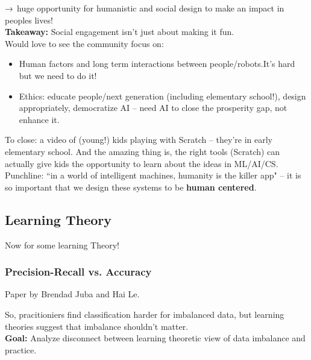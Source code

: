 $\rightarrow$ huge opportunity for humanistic and social design to make an impact in peoples lives! \\

{\bf Takeaway:} Social engagement isn't just about making it fun. \\

Would love to see the community focus on:
\begin{itemize}
    \item Human factors and long term interactions between people/robots.It's hard but we need to do it!
    \item Ethics: educate people/next generation (including elementary school!), design appropriately, democratize AI -- need AI to close the prosperity gap, not enhance it.
\end{itemize}

To close: a video of (young!) kids playing with Scratch -- they're in early elementary school. And the amazing thing is, the right tools (Scratch) can actually give kids the opportunity to learn about the ideas in ML/AI/CS. \\

Punchline: ``in a world of intelligent machines, humanity is the killer app" -- it is so important that we design these systems to be {\bf human centered}.



\spacerule
\subsection{Learning Theory}

Now for some learning Theory!

\subsubsection{Precision-Recall vs. Accuracy~\cite{juba2017precision}}

Paper by Brendad Juba and Hai Le. \\


So, pracitioniers find classification harder for imbalanced data, but learning theories suggest that imbalance shouldn't matter. \\

{\bf Goal:} Analyze disconnect between learning theoretic view of data imbalance and practice. \\

